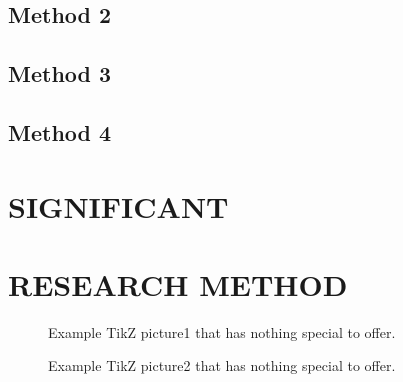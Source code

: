 \documentclass[a4paper]{article}
\begin{document}
\subsection{Method 2}
\subsection{Method 3}
\subsection{Method 4}
\section{SIGNIFICANT}
\newpage
\section{RESEARCH METHOD}
\begin{center}

\end{center}




\newpage
\begin{center}
\begin{figure}
\subfigure[abc]{

}
\hfill
\subfigure[abc]{

}
\end{figure}
\end{center}

\newpage
\begin{figure}[H]
\centering

\caption{Example TikZ picture1 that has nothing special to offer.}
\label{fig_Squares1}

\caption{Example TikZ picture2 that has nothing special to offer.}
\label{fig_Squares2}

\end{figure}




\newpage


\end{document}
